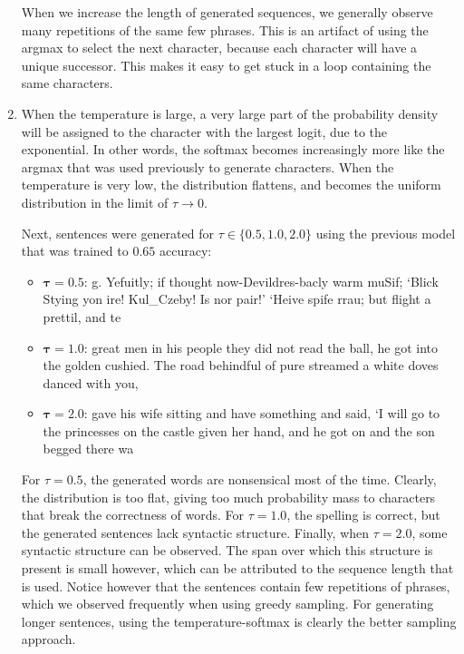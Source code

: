 \documentclass{article}
\begin{document}
\begin{enumerate}[label = (\alph*)]
	When we increase the length of generated sequences, we generally observe many repetitions of the same few phrases. This is an artifact of using the argmax to select the next character, because each character will have a unique successor. This makes it easy to get stuck in a loop containing the same characters. 
	\item When the temperature is large, a very large part of the probability density will be assigned to the character with the largest logit, due to the exponential. In other words, the softmax becomes increasingly more like the argmax that was used previously to generate characters. When the temperature is very low, the distribution flattens, and becomes the uniform distribution in the limit of $\tau \to 0$. 
	
	Next, sentences were generated for $\tau \in \{0.5, 1.0, 2.0\}$ using the previous model that was trained to $0.65$ accuracy:
	\begin{itemize}
		\item $\boldsymbol{\tau = 0.5}$: g. Yefuitly; if thought now-Devildres-bacly warm muSif; ‘Blick Stying yon ire! Kul\_Czeby! Is nor pair!’
		‘Heive spife
		rrau;
		but flight a prettil, and te\\
		\item $\boldsymbol{\tau = 1.0}$: great men in his people they did not read
		the ball, he got into the golden cushied. The road behindful of pure
		streamed a white doves danced with you, \\
		\item $\boldsymbol{\tau = 2.0}$: gave his wife sitting and have something and said, ‘I will go to the princesses on the castle
		given her hand, and he got on and the son begged there wa
	\end{itemize}
	For $\tau = 0.5$, the generated words are nonsensical most of the time. Clearly, the distribution is too flat, giving too much probability mass to characters that break the correctness of words. For $\tau = 1.0$, the spelling is correct, but the generated sentences lack syntactic structure. Finally, when $\tau = 2.0$, some syntactic structure can be observed. The span over which this structure is present is small however, which can be attributed to the sequence length that is used. Notice however that the sentences contain few repetitions of phrases, which we observed frequently when using greedy sampling. For generating longer sentences, using the temperature-softmax is clearly the better sampling approach.
\end{enumerate}
\end{document}

